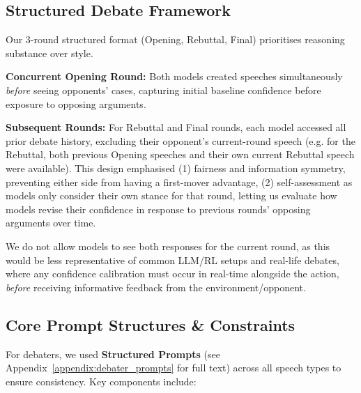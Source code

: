 \documentclass{article}
\begin{document}
\subsection{Structured Debate Framework}
\label{subsec:debate_framework}

Our 3-round structured format (Opening, Rebuttal, Final) prioritises reasoning substance over style.

\textbf{Concurrent Opening Round:} Both models created speeches simultaneously \textit{before} seeing opponents' cases, capturing initial baseline confidence before exposure to opposing arguments.

\textbf{Subsequent Rounds:} For Rebuttal and Final rounds, each model accessed all prior debate history, excluding their opponent's current-round speech (e.g. for the Rebuttal, both previous Opening speeches and their own current Rebuttal speech were available). This design emphasised (1) fairness and information symmetry, preventing either side from having a first-mover advantage, (2) self-assessment as models only consider their own stance for that round, letting us evaluate how models revise their confidence in response to previous rounds' opposing arguments over time.

We do not allow models to see both responses for the current round, as this would be less representative of common LLM/RL setups and real-life debates, where any confidence calibration must occur in real-time alongside the action, \textit{before} receiving informative feedback from the environment/opponent.

\subsection{Core Prompt Structures \& Constraints}
\label{subsec:prompts}
For debaters, we used \textbf{Structured Prompts} (see Appendix~\ref{appendix:debater_prompts} for full text) across all speech types to ensure consistency. Key components include:
\end{document}
